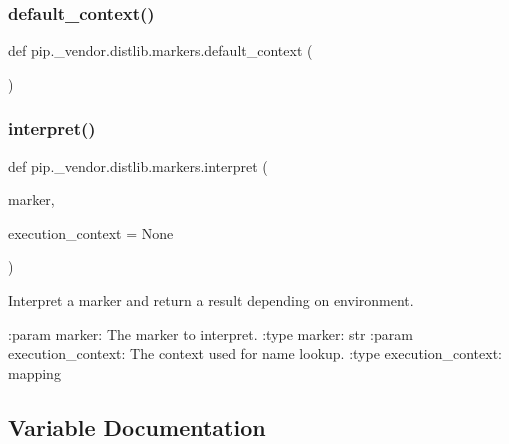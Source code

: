 \subsubsection{\texorpdfstring{default\+\_\+context()}{default\_context()}}
{\footnotesize\ttfamily def pip.\+\_\+vendor.\+distlib.\+markers.\+default\+\_\+context (\begin{DoxyParamCaption}{ }\end{DoxyParamCaption})}

\mbox{\label{namespacepip_1_1__vendor_1_1distlib_1_1markers_a9799f8442440235d4c12b42de912ce64}} 
\subsubsection{\texorpdfstring{interpret()}{interpret()}}
{\footnotesize\ttfamily def pip.\+\_\+vendor.\+distlib.\+markers.\+interpret (\begin{DoxyParamCaption}\item[{}]{marker,  }\item[{}]{execution\+\_\+context = {\ttfamily None} }\end{DoxyParamCaption})}

\begin{DoxyVerb}Interpret a marker and return a result depending on environment.

:param marker: The marker to interpret.
:type marker: str
:param execution_context: The context used for name lookup.
:type execution_context: mapping
\end{DoxyVerb}
 

\subsection{Variable Documentation}
\mbox{\label{namespacepip_1_1__vendor_1_1distlib_1_1markers_a14d5097d8e42b6ce75b87ff57f1212b6}} 

